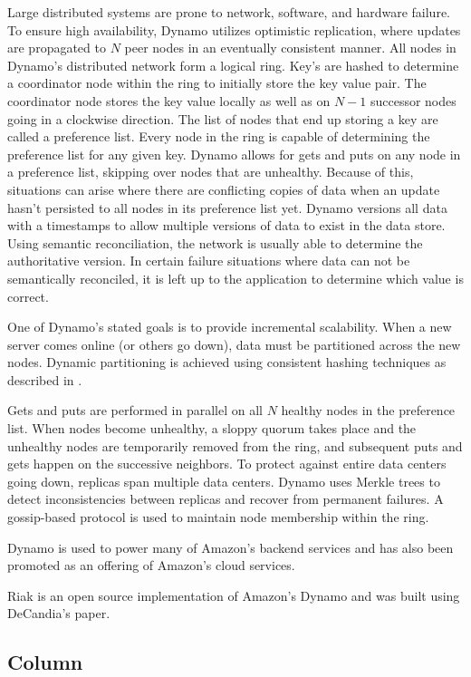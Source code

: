 \documentclass[]{article}
\begin{document}
Large distributed systems are prone to network, software, and hardware failure. To ensure high availability, Dynamo utilizes optimistic replication, where updates are propagated to $N$ peer nodes in an eventually consistent manner. All nodes in Dynamo's distributed network form a logical ring. Key's are hashed to determine a coordinator node within the ring to initially store the key value pair. The coordinator node stores the key value locally as well as on $N-1$ successor nodes going in a clockwise direction. The list of nodes that end up storing a key are called a preference list. Every node in the ring is capable of determining the preference list for any given key. Dynamo allows for gets and puts on any node in a preference list, skipping over nodes that are unhealthy. Because of this, situations can arise where there are conflicting copies of data when an update hasn't persisted to all nodes in its preference list yet. Dynamo versions all data with a timestamps to allow multiple versions of data to exist in the data store. Using semantic reconciliation, the network is usually able to determine the authoritative version. In certain failure situations where data can not be semantically reconciled, it is left up to the application to determine which value is correct.

One of Dynamo's stated goals is to provide incremental scalability. When a new server comes online (or others go down), data must be partitioned across the new nodes. Dynamic partitioning is achieved using consistent hashing techniques as described in \cite{karger_consistent_1997}.

Gets and puts are performed in parallel on all $N$ healthy nodes in the preference list. When nodes become unhealthy, a sloppy quorum takes place and the unhealthy nodes are temporarily removed from the ring, and subsequent puts and gets happen on the successive neighbors. To protect against entire data centers going down, replicas span multiple data centers. Dynamo uses Merkle trees to detect inconsistencies between replicas and recover from permanent failures. A gossip-based protocol is used to maintain node membership within the ring.

Dynamo is used to power many of Amazon's backend services and has also been promoted as an offering of Amazon's cloud services.

Riak\cite{Klophaus:2010:RCB:1900160.1900176} is an open source implementation of Amazon's Dynamo and was built using DeCandia's paper.

\subsection{Column}
\end{document}
